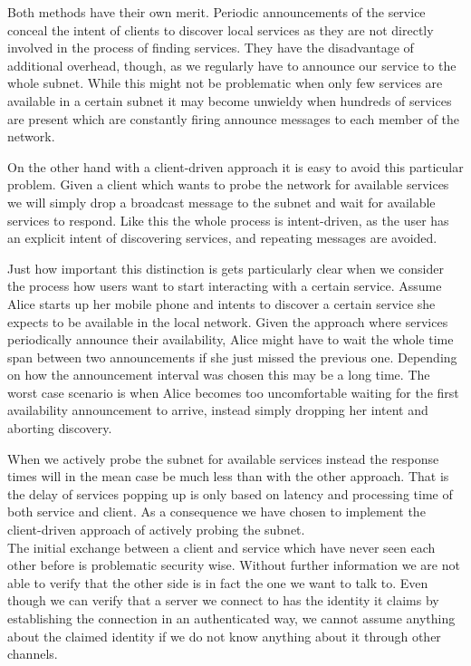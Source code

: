 Both methods have their own merit.
Periodic announcements of the service conceal the intent of clients to discover local services as they are not directly involved in the process of finding services.
They have the disadvantage of additional overhead, though, as we regularly have to announce our service to the whole subnet.
While this might not be problematic when only few services are available in a certain subnet it may become unwieldy when hundreds of services are present which are constantly firing announce messages to each member of the network.

On the other hand with a client-driven approach it is easy to avoid this particular problem.
Given a client which wants to probe the network for available services we will simply drop a broadcast message to the subnet and wait for available services to respond.
Like this the whole process is intent-driven, as the user has an explicit intent of discovering services, and repeating messages are avoided.

Just how important this distinction is gets particularly clear when we consider the process how users want to start interacting with a certain service.
Assume Alice starts up her mobile phone and intents to discover a certain service she expects to be available in the local network.
Given the approach where services periodically announce their availability, Alice might have to wait the whole time span between two announcements if she just missed the previous one.
Depending on how the announcement interval was chosen this may be a long time.
The worst case scenario is when Alice becomes too uncomfortable waiting for the first availability announcement to arrive, instead simply dropping her intent and aborting discovery.

When we actively probe the subnet for available services instead the response times will in the mean case be much less than with the other approach.
That is the delay of services popping up is only based on latency and processing time of both service and client.
As a consequence we have chosen to implement the client-driven approach of actively probing the subnet.\\


The initial exchange between a client and service which have never seen each other before is problematic security wise.
Without further information we are not able to verify that the other side is in fact the one we want to talk to.
Even though we can verify that a server we connect to has the identity it claims by establishing the connection in an authenticated way, we cannot assume anything about the claimed identity if we do not know anything about it through other channels.

